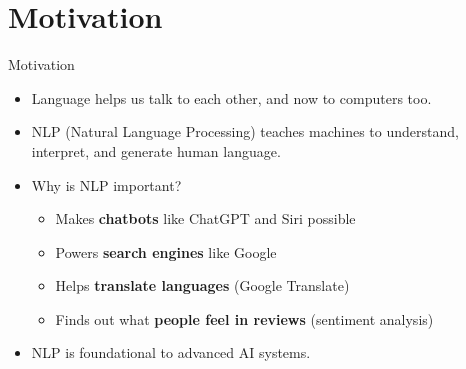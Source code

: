 \section{Motivation}
\begin{frame}{Motivation}
    \begin{itemize}
        \setlength{\itemsep}{0.75em}
        \item Language helps us talk to each other, and now to computers too.
        \item NLP (Natural Language Processing) teaches machines to understand, interpret, and generate human language.
        \item Why is NLP important?
        \begin{itemize}
            \item Makes \textbf{chatbots} like ChatGPT and Siri possible
            \item Powers \textbf{search engines} like Google
            \item Helps \textbf{translate languages} (Google Translate)
            \item Finds out what \textbf{people feel in reviews} (sentiment analysis)
        \end{itemize}
        \item NLP is foundational to advanced AI systems.
    \end{itemize}

\end{frame}
